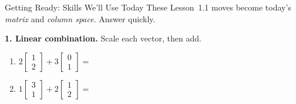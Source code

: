 \documentclass[10pt]{article}
\begin{document}

\vspace{0.12in}

\begin{notesbox}{Getting Ready: Skills We'll Use Today}
\small These Lesson~1.1 moves become today's \emph{matrix} and \emph{column space}. Answer quickly.

\vspace{4pt}
\textbf{1. Linear combination.} Scale each vector, then add.
\begin{enumerate}[label=(\alph*), leftmargin=2.0em, itemsep=10pt]
  \item $2\begin{bmatrix} 1 \\ 2 \end{bmatrix} + 3\begin{bmatrix} 0 \\ 1 \end{bmatrix}
        = {}$
  \item $1\begin{bmatrix} 3 \\ 1 \end{bmatrix} + 2\begin{bmatrix} 1 \\ 2 \end{bmatrix}
        = {}$
\end{enumerate}


\end{notesbox}
\end{document}
